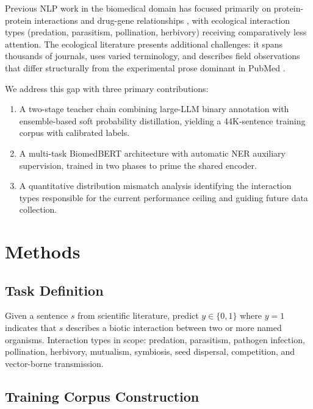 \documentclass[12pt,a4paper]{article}
\begin{document}
Previous NLP work in the biomedical domain has focused primarily on
protein-protein interactions \citep{bunescu2005comparative} and drug-gene
relationships \citep{lim2018drug}, with ecological interaction types
(predation, parasitism, pollination, herbivory) receiving comparatively less
attention. The ecological literature presents additional challenges: it spans
thousands of journals, uses varied terminology, and describes field
observations that differ structurally from the experimental prose dominant
in PubMed \citep{badenes2020detecting}.

We address this gap with three primary contributions:
\begin{enumerate}
    \item A two-stage teacher chain combining large-LLM binary annotation
    with ensemble-based soft probability distillation, yielding a
    44K-sentence training corpus with calibrated labels.
    \item A multi-task BiomedBERT architecture with automatic NER auxiliary
    supervision, trained in two phases to prime the shared encoder.
    \item A quantitative distribution mismatch analysis identifying the
    interaction types responsible for the current performance ceiling and
    guiding future data collection.
\end{enumerate}

\section{Methods}
\label{sec:methods}

\subsection{Task Definition}

Given a sentence $s$ from scientific literature, predict $y \in \{0, 1\}$
where $y=1$ indicates that $s$ describes a biotic interaction between two
or more named organisms. Interaction types in scope: predation, parasitism,
pathogen infection, pollination, herbivory, mutualism, symbiosis, seed
dispersal, competition, and vector-borne transmission.

\subsection{Training Corpus Construction}
\label{sec:data}
\end{document}
